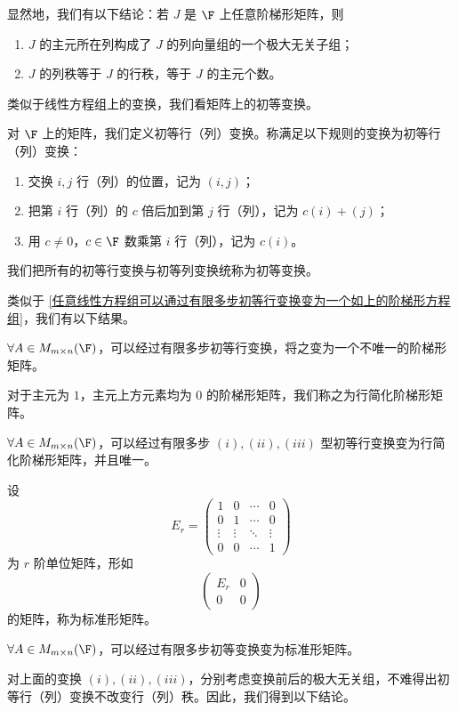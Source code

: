 显然地，我们有以下结论：若 $J$ 是 $\F$ 上任意阶梯形矩阵，则
\begin{enumerate}
	\item $J$ 的主元所在列构成了 $J$ 的列向量组的一个极大无关子组；
	\item $J$ 的列秩等于 $J$ 的行秩，等于 $J$ 的主元个数。
\end{enumerate}

类似于线性方程组上的变换，我们看矩阵上的初等变换。

\begin{definition}
	对 $\F$ 上的矩阵，我们定义初等行（列）变换。称满足以下规则的变换为初等行（列）变换：
	\begin{enumerate}
		\item 交换 $i,j$ 行（列）的位置，记为 $(i,j)$；
		\item 把第 $i$ 行（列）的 $c$ 倍后加到第 $j$ 行（列），记为 $c(i)+(j)$；
		\item 用 $c\neq0$，$c\in\F$ 数乘第 $i$ 行（列），记为 $c(i)$。
	\end{enumerate}
	我们把所有的初等行变换与初等列变换统称为初等变换。
\end{definition}

类似于 \ref{任意线性方程组可以通过有限多步初等行变换变为一个如上的阶梯形方程组}，我们有以下结果。

\begin{lemma}
	$\forall A\in M_{m\times n}(\F)$，可以经过有限多步初等行变换，将之变为一个不唯一的阶梯形矩阵。
\end{lemma}

对于主元为 $1$，主元上方元素均为 $0$ 的阶梯形矩阵，我们称之为行简化阶梯形矩阵。

$\forall A\in M_{m\times n}(\F)$，可以经过有限多步 $(i),(ii),(iii)$ 型初等行变换变为行简化阶梯形矩阵，并且唯一。

设
\[
E_r=
\begin{pmatrix}
	1&0&\cdots&0\\
	0&1&\cdots&0\\
	\vdots&\vdots&\ddots&\vdots\\
	0&0&\cdots&1
\end{pmatrix}
\]
为 $r$ 阶单位矩阵，形如
\[
\begin{pmatrix}
	E_r&0\\
	0&0
\end{pmatrix}
\]
的矩阵，称为标准形矩阵。

$\forall A\in M_{m\times n}(\F)$，可以经过有限多步初等变换变为标准形矩阵。

对上面的变换 $(i),(ii),(iii)$，分别考虑变换前后的极大无关组，不难得出初等行（列）变换不改变行（列）秩。因此，我们得到以下结论。

